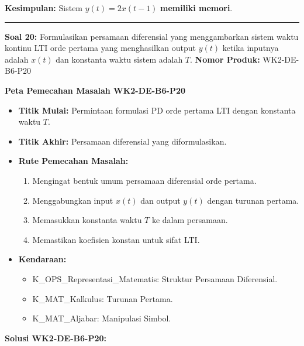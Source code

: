 \documentclass[
  letterpaper,
  DIV=11,
  numbers=noendperiod]{scrreprt}
\providecommand{\tightlist}{%
  \setlength{\itemsep}{0pt}\setlength{\parskip}{0pt}}
\begin{document}
\textbf{Kesimpulan:} Sistem \(y(t) = 2x(t-1)\) \textbf{memiliki memori}.

\begin{center}\rule{0.5\linewidth}{0.5pt}\end{center}

\textbf{Soal 20:} Formulasikan persamaan diferensial yang menggambarkan
sistem waktu kontinu LTI orde pertama yang menghasilkan output \(y(t)\)
ketika inputnya adalah \(x(t)\) dan konstanta waktu sistem adalah \(T\).
\textbf{Nomor Produk:} WK2-DE-B6-P20

\textbf{Peta Pemecahan Masalah WK2-DE-B6-P20}

\begin{itemize}
\tightlist
\item
  \textbf{Titik Mulai:} Permintaan formulasi PD orde pertama LTI dengan
  konstanta waktu \(T\).
\item
  \textbf{Titik Akhir:} Persamaan diferensial yang diformulasikan.
\item
  \textbf{Rute Pemecahan Masalah:}

  \begin{enumerate}
  \def\labelenumi{\arabic{enumi}.}
  \tightlist
  \item
    Mengingat bentuk umum persamaan diferensial orde pertama.
  \item
    Menggabungkan input \(x(t)\) dan output \(y(t)\) dengan turunan
    pertama.
  \item
    Memasukkan konstanta waktu \(T\) ke dalam persamaan.
  \item
    Memastikan koefisien konstan untuk sifat LTI.
  \end{enumerate}
\item
  \textbf{Kendaraan:}

  \begin{itemize}
  \tightlist
  \item
    K\_OPS\_Representasi\_Matematis: Struktur Persamaan Diferensial.
  \item
    K\_MAT\_Kalkulus: Turunan Pertama.
  \item
    K\_MAT\_Aljabar: Manipulasi Simbol.
  \end{itemize}
\end{itemize}

\textbf{Solusi WK2-DE-B6-P20:}
\end{document}
